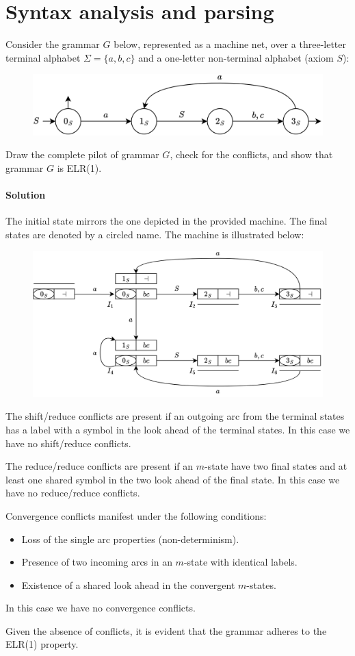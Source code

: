 \section{Syntax analysis and parsing}

Consider the grammar $G$ below, represented as a machine net, over a three-letter terminal alphabet $\Sigma=\{a,b,c\}$ and a one-letter non-terminal alphabet (axiom $S$):
\begin{figure}[H]
    \centering
    \includegraphics[width=0.5\linewidth]{images/mnet.png}
\end{figure}
Draw the complete pilot of grammar $G$, check for the conflicts, and show that grammar $G$ is ELR(1).

\paragraph*{Solution}
The initial state mirrors the one depicted in the provided machine. 
The final states are denoted by a circled name. 
The machine is illustrated below:
\begin{figure}[H]
    \centering
    \includegraphics[width=0.75\linewidth]{images/pilot.png}
\end{figure} 
The shift/reduce conflicts are present if an outgoing arc from the terminal states has a label with a symbol in the look ahead of the terminal states. 
In this case we have no shift/reduce conflicts. 

The reduce/reduce conflicts are present if an $m$-state have two final states and at least one shared symbol in the two look ahead of the final state. 
In this case we have no reduce/reduce conflicts. 

Convergence conflicts manifest under the following conditions:
\begin{itemize}
    \item Loss of the single arc properties (non-determinism).
    \item Presence of two incoming arcs in an $m$-state with identical labels.
    \item Existence of a shared look ahead in the convergent $m$-states.
\end{itemize}
In this case we have no convergence conflicts. 

Given the absence of conflicts, it is evident that the grammar adheres to the ELR(1) property.
